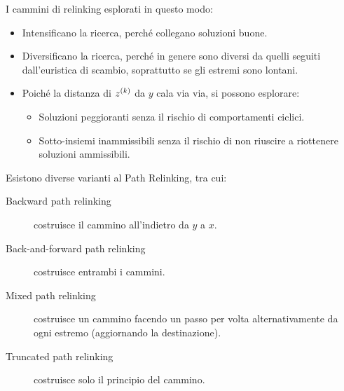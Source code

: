 \documentclass[\main/main.tex]{subfiles}
\begin{document}
\begin{definition}
    I cammini di relinking esplorati in questo modo:
    \begin{itemize}
        \item Intensificano la ricerca, perché collegano soluzioni buone.
        \item Diversificano la ricerca, perché in genere sono diversi da quelli seguiti dall'euristica di scambio, soprattutto se gli estremi sono lontani.
        \item Poiché la distanza di \(z^{\left(k\right)}\) da \(y\) cala via via, si possono esplorare:
        \begin{itemize}
            \item Soluzioni peggioranti senza il rischio di comportamenti ciclici.
            \item Sotto-insiemi inammissibili senza il rischio di non riuscire a riottenere soluzioni ammissibili.
        \end{itemize}
    \end{itemize}
\end{definition}
\begin{observation}
    Esistono diverse varianti al Path Relinking, tra cui:
    \begin{description}
    \item[Backward path relinking] costruisce il cammino all'indietro da \(y\) a \(x\).
    \item[Back-and-forward path relinking] costruisce entrambi i cammini.
    \item[Mixed path relinking] costruisce un cammino facendo un passo per volta alternativamente da ogni estremo (aggiornando la destinazione).
    \item[Truncated path relinking] costruisce solo il principio del cammino.
    \end{description}    
\end{observation}
\end{document}
